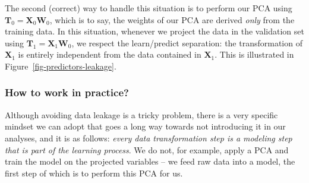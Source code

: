 \documentclass[
  letterpaper,
]{scrbook}
\begin{document}
\begin{figure}[bt]



\end{figure}%

The second (correct) way to handle this situation is to perform our PCA
using \(\mathbf{T}_0 = \mathbf{X}_0\mathbf{W}_0\), which is to say, the
weights of our PCA are derived \emph{only} from the training data. In
this situation, whenever we project the data in the validation set using
\(\mathbf{T}_1 = \mathbf{X}_1\mathbf{W}_0\), we respect the
learn/predict separation: the transformation of \(\mathbf{X}_1\) is
entirely independent from the data contained in \(\mathbf{X}_1\). This
is illustrated in Figure~\ref{fig-predictors-leakage}.

\subsubsection{How to work in practice?}\label{how-to-work-in-practice}

Although avoiding data leakage is a tricky problem, there is a very
specific mindset we can adopt that goes a long way towards not
introducing it in our analyses, and it is as follows: \emph{every data
transformation step is a modeling step that is part of the learning
process}. We do not, for example, apply a PCA and train the model on the
projected variables -- we feed raw data into a model, the first step of
which is to perform this PCA for us.
\end{document}
